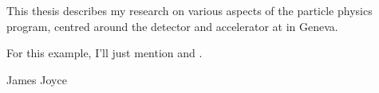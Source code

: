 \begin{preface}
    This thesis describes my research on various aspects of the \LHCb
    particle physics program, centred around the \LHCb detector and \LHC
    accelerator at \CERN in Geneva.

    \noindent
    For this example, I'll just mention 
    and .
\end{preface}

\tableofcontents


%
{James Joyce}
\thispagestyle{empty}
